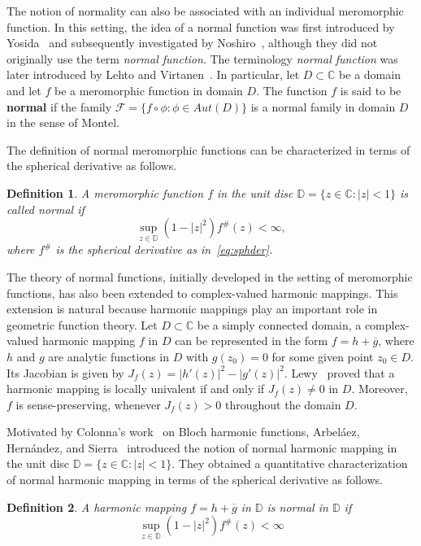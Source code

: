 \documentclass[10pt,a4paper]{amsart}
\numberwithin{equation}{section}
\newtheorem{definition}{Definition}[section]
\begin{document}
The notion of normality can also be associated with an individual
meromorphic function. In this setting,
the idea of a normal function was first introduced 
by Yosida~\cite{Yosida1934} and
subsequently investigated by Noshiro~\cite{Noshiro1938}, although
they did not originally use the term {\it normal function}.
The terminology {\it normal function} was later introduced 
by Lehto and Virtanen~\cite{LehtoVirtanen1957}. In particular, let $D\subset\mathbb{C}$
 be a domain and let $f$ be a meromorphic function in
 domain $D$. The function $f$ is said to be
 {\bf normal} if the family $\mathcal{F}=\{f\circ\phi: \phi \in Aut{(D)}\}$
 is a normal family in domain $D$ in the sense of Montel.
 \smallskip
 
 The definition of normal meromorphic functions can be 
 characterized in terms of the spherical derivative as follows.

\begin{definition}\cite{LehtoVirtanen1957}
  A meromorphic function $f$ in the unit disc 
  $\mathbb{D}=\{z\in \mathbb{C}:|z|<1\}$ is
  called normal if
  \[
  \sup_{z\in\mathbb{D}}(1-|z|^2)f^\#(z)<\infty,
  \] 
  where $f^\#$ is the spherical derivative as in~\eqref{eq:sphder}.
\end{definition}

The theory of normal functions, initially developed
in the setting of meromorphic functions, has also been 
extended to complex-valued harmonic mappings. This extension is natural
because harmonic mappings play an important role in
geometric function theory.
Let $D\subset \mathbb{C}$ be a simply connected domain, 
a complex-valued harmonic mapping $f$
in $D$ can be represented in the form 
$f=h+\overline{g}$, where $h$ and $g$
are analytic functions in $D$ with $g(z_0)=0$ for some given
point $z_0\in D$. Its Jacobian is given by 
$J_f(z)=|h'(z)|^2-|g'(z)|^2$. Lewy~\cite{Lewy1936}
proved that
a harmonic mapping is locally univalent if and only 
if $J_f(z)\neq0$ in $D$. Moreover,
$f$ is sense-preserving, whenever $J_f(z)>0$ 
throughout the domain $D$.
\smallskip

 Motivated by Colonna's work~\cite{colona} on
  Bloch harmonic functions, Arbel\'aez,
 Hern\'andez, and Sierra~\cite{Arbelaez2019} 
 introduced the notion of normal harmonic mapping in the 
 unit disc $\mathbb{D}=\{z\in \mathbb{C}: |z|<1\}$.
 They obtained a quantitative characterization of normal harmonic 
 mapping in terms of the spherical derivative as follows.
  
\begin{definition}\cite[Proposition 2.1]{Arbelaez2019}
  A harmonic mapping $f=h+\overline{g}$ in $\mathbb{D}$ 
  is normal in $\mathbb{D}$ if 
  \[
  \sup_{z\in\mathbb{D}}(1-|z|^2)f^\#(z)<\infty
  \] 
  
\end{definition}
\end{document}
